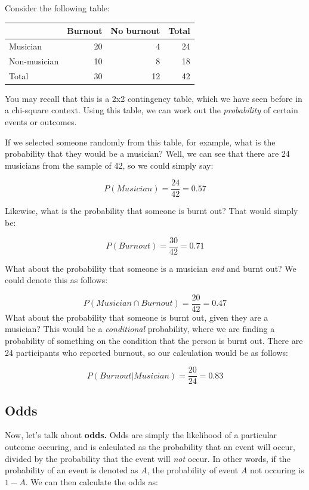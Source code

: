 \documentclass[
]{book}
\begin{document}
Consider the following table:

\begin{tabular}{l|r|r|r}
\hline
 & Burnout & No burnout & Total\\
\hline
Musician & 20 & 4 & 24\\
\hline
Non-musician & 10 & 8 & 18\\
\hline
Total & 30 & 12 & 42\\
\hline
\end{tabular}

You may recall that this is a 2x2 contingency table, which we have seen before in a chi-square context. Using this table, we can work out the \emph{probability} of certain events or outcomes.

If we selected someone randomly from this table, for example, what is the probability that they would be a musician? Well, we can see that there are 24 musicians from the sample of 42, so we could simply say:

\[
P(Musician) = \frac{24}{42} = 0.57
\]

Likewise, what is the probability that someone is burnt out? That would simply be:

\[
P(Burnout) = \frac{30}{42} = 0.71
\]

What about the probability that someone is a musician \emph{and} and burnt out? We could denote this as follows:

\[
P(Musician \cap Burnout) = \frac{20}{42} = 0.47
\]
What about the probability that someone is burnt out, given they are a musician? This would be a \emph{conditional} probability, where we are finding a probability of something on the condition that the person is burnt out. There are 24 participants who reported burnout, so our calculation would be as follows:

\[
P(Burnout | Musician) = \frac{20}{24} = 0.83
\]

\hypertarget{odds}{%
\subsection{Odds}\label{odds}}

Now, let's talk about \textbf{odds.} Odds are simply the likelihood of a particular outcome occuring, and is calculated as the probability that an event will occur, divided by the probability that the event will \emph{not} occur. In other words, if the probability of an event is denoted as \(A\), the probability of event \(A\) not occuring is \(1-A\). We can then calculate the odds as:
\end{document}
